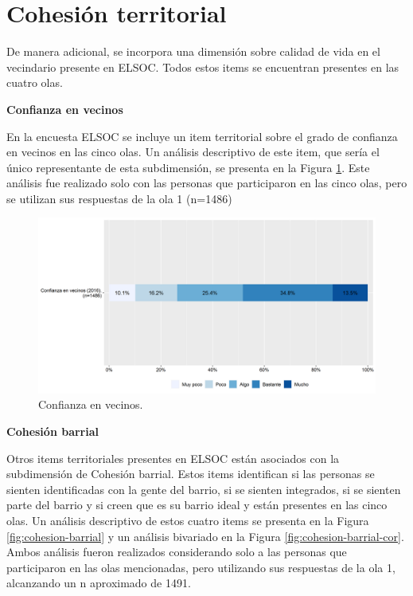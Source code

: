\documentclass[
  12pt,
]{book}
\begin{document}
\hypertarget{cohesiuxf3n-territorial}{%
\section{Cohesión territorial}\label{cohesiuxf3n-territorial}}

De manera adicional, se incorpora una dimensión sobre calidad de vida en el vecindario presente en ELSOC. Todos estos items se encuentran presentes en las cuatro olas.

\textbf{Confianza en vecinos}

En la encuesta ELSOC se incluye un item territorial sobre el grado de confianza en vecinos en las cinco olas. Un análisis descriptivo de este item, que sería el único representante de esta subdimensión, se presenta en la Figura \ref{fig:confianza-vecinos}. Este análisis fue realizado solo con las personas que participaron en las cinco olas, pero se utilizan sus respuestas de la ola 1 (n=1486)

\begin{figure}[H]

{\centering \includegraphics[width=1\linewidth,height=1\textheight]{output/graphs/confianza-vecinos} 

}

\caption{Confianza en vecinos.}\label{fig:confianza-vecinos}
\end{figure}

\textbf{Cohesión barrial}

Otros items territoriales presentes en ELSOC están asociados con la subdimensión de Cohesión barrial. Estos items identifican si las personas se sienten identificadas con la gente del barrio, si se sienten integrados, si se sienten parte del barrio y si creen que es su barrio ideal y están presentes en las cinco olas. Un análisis descriptivo de estos cuatro items se presenta en la Figura \ref{fig:cohesion-barrial} y un análisis bivariado en la Figura \ref{fig:cohesion-barrial-cor}. Ambos análisis fueron realizados considerando solo a las personas que participaron en las olas mencionadas, pero utilizando sus respuestas de la ola 1, alcanzando un n aproximado de 1491.
\end{document}
